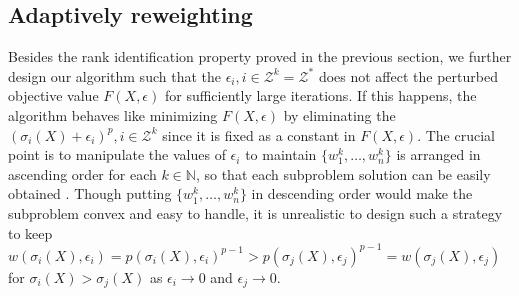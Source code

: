 \documentclass[twoside,11pt]{article}
\newcommand{\Zcal}{\mathcal{Z}}
\numberwithin{equation}{section}
\begin{document}
\subsection{Adaptively reweighting}  
Besides the rank identification property proved in the previous section, we further design our algorithm such that the $\epsilon_i, i\in\mathcal{Z}^k = \Zcal^*$  does not affect the perturbed objective value  $F(X, \epsilon)$ for sufficiently large iterations.   
If this happens, the algorithm behaves like minimizing $F(X, \epsilon)$  by eliminating the  $(\sigma_i(X)+\epsilon_i)^p, i\in\mathcal{Z}^k$ since it  is fixed as a constant in $F(X,\epsilon)$.  
The crucial point is to manipulate the values of $\epsilon_i$ to maintain $\{ w_1^k, \ldots, w_n^k\}$ is arranged in ascending order for each $k\in\mathbb{N}$,  so that each subproblem solution can be easily obtained \cite{ge_nn_LRMM_Canyi_2014}. Though putting $\{ w_1^k, \ldots, w_n^k\}$ in descending order would  make the subproblem  convex and easy to handle, it is unrealistic to design such a strategy to keep  $w(\sigma_i(X), \epsilon_i) = p(\sigma_i(X), \epsilon_i)^{p-1} >  p(\sigma_j(X), \epsilon_j)^{p-1} = w(\sigma_j(X), \epsilon_j)$ for $\sigma_i(X) > \sigma_j(X)$ as $\epsilon_i\to 0$ and $\epsilon_j \to 0$. 
\end{document}
